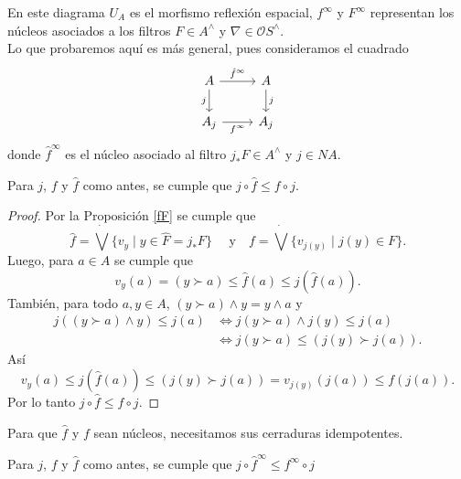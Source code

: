 En este diagrama $U_A$ es el morfismo reflexión espacial, $f^\infty$ y $F^\infty$ representan los núcleos asociados a los filtros $F\in A^\wedge$ y $\nabla\in \mathcal{O}S^\wedge$.\\

Lo que probaremos aquí es más general, pues consideramos el cuadrado 
\[\begin{tikzcd}
	A & A \\
	{A_j} & {A_j}
	\arrow["{\hat{f}^\infty}", from=1-1, to=1-2]
	\arrow["j"', from=1-1, to=2-1]
	\arrow["j", from=1-2, to=2-2]
	\arrow["{f^\infty}"', from=2-1, to=2-2]
\end{tikzcd}
\]
donde $\hat{f}^\infty$ es el núcleo asociado al filtro $j_*F\in A^\wedge$ y $j\in NA$.  

\begin{lem}\label{f1f}
    Para $j$, $f$ y $\hat{f}$ como antes, se cumple que $j\circ \hat{f}\leq f\circ j$.
\end{lem}

\begin{proof}
    Por la Proposición \ref{fF} se cumple que
    \[
    \hat{f}=\dot{\bigvee}\{v_y\mid y\in \hat{F}=j_*F\}\quad  \mbox{ y} \quad f=\dot{\bigvee}\{v_{j(y)}\mid j(y)\in F\}. 
    \]
Luego, para $a\in A$ se cumple que
\[
v_y(a)=(y\succ a)\leq \hat{f}(a)\leq j(\hat{f}(a)).
\]
También, para todo $a,y\in A$, $(y\succ a)\wedge y=y\wedge a$ y
\[
\begin{split}
j((y\succ a)\wedge y)\leq j(a) & \Leftrightarrow j(y\succ a)\wedge j(y)\leq j(a)\\
& \Leftrightarrow j(y\succ a)\leq (j(y)\succ j(a)).
\end{split}
\]
Así
\[
v_y(a)\leq j(\hat{f}(a))\leq (j(y)\succ j(a))=v_{j(y)}(j(a))\leq f(j(a)).
\]
Por lo tanto $j\circ \hat{f}\leq f\circ j$.
\end{proof}

Para que $\hat{f}$ y $f$ sean núcleos, necesitamos sus cerraduras idempotentes.

\begin{cor}\label{finftyf}
    Para $j$, $f$ y $\hat{f}$ como antes, se cumple que $j\circ \hat{f}^\infty\leq f^\infty\circ j$
\end{cor}

